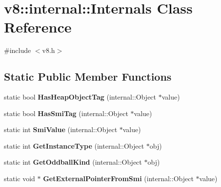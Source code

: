 \hypertarget{classv8_1_1internal_1_1_internals}{}\section{v8\+:\+:internal\+:\+:Internals Class Reference}
\label{classv8_1_1internal_1_1_internals}


{\ttfamily \#include $<$v8.\+h$>$}

\subsection*{Static Public Member Functions}
\begin{DoxyCompactItemize}
\item 
\hypertarget{classv8_1_1internal_1_1_internals_a2d3dc335df00b84e7e242e40012238ae}{}static bool {\bfseries Has\+Heap\+Object\+Tag} (internal\+::\+Object $\ast$value)\label{classv8_1_1internal_1_1_internals_a2d3dc335df00b84e7e242e40012238ae}

\item 
\hypertarget{classv8_1_1internal_1_1_internals_a6163342aeb37f207d618d9fb5d646a04}{}static bool {\bfseries Has\+Smi\+Tag} (internal\+::\+Object $\ast$value)\label{classv8_1_1internal_1_1_internals_a6163342aeb37f207d618d9fb5d646a04}

\item 
\hypertarget{classv8_1_1internal_1_1_internals_a9a26879dad8b7fdd38ebbeaad162b96c}{}static int {\bfseries Smi\+Value} (internal\+::\+Object $\ast$value)\label{classv8_1_1internal_1_1_internals_a9a26879dad8b7fdd38ebbeaad162b96c}

\item 
\hypertarget{classv8_1_1internal_1_1_internals_aec6dbaf56b230e37eef5ed1ed0e56a9b}{}static int {\bfseries Get\+Instance\+Type} (internal\+::\+Object $\ast$obj)\label{classv8_1_1internal_1_1_internals_aec6dbaf56b230e37eef5ed1ed0e56a9b}

\item 
\hypertarget{classv8_1_1internal_1_1_internals_a3078cd69f5af6f5b9fc1f7345a4642e8}{}static int {\bfseries Get\+Oddball\+Kind} (internal\+::\+Object $\ast$obj)\label{classv8_1_1internal_1_1_internals_a3078cd69f5af6f5b9fc1f7345a4642e8}

\item 
\hypertarget{classv8_1_1internal_1_1_internals_a8d2a279f64ec567973765a5704b63b07}{}static void $\ast$ {\bfseries Get\+External\+Pointer\+From\+Smi} (internal\+::\+Object $\ast$value)\label{classv8_1_1internal_1_1_internals_a8d2a279f64ec567973765a5704b63b07}


\end{DoxyCompactItemize}
